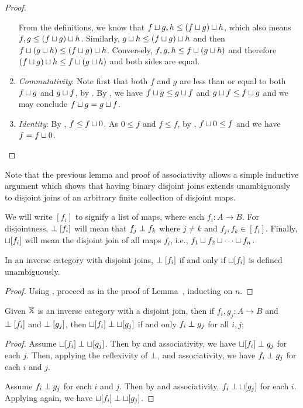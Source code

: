 \begin{proof}
\begin{enumerate}[{(}i{)}]
      From the definitions, we know that $f\sqcup g, h \le (f\sqcup g)\sqcup h$, which also means
      $f, g \le (f\sqcup g)\sqcup h$. Similarly, $g\sqcup h \le (f\sqcup g)\sqcup h $ and then $f
      \sqcup (g\sqcup h)\le (f\sqcup g)\sqcup h$. Conversely, $f,g,h \le f \sqcup (g\sqcup h)$ and
      therefore $(f\sqcup g)\sqcup h \le f \sqcup (g\sqcup h)$ and both sides are equal.
    \item \emph{Commutativity}: Note first that both $f$ and $g$ are less than or equal to both
      $f\sqcup g$ and $g \sqcup f$, by . By , we have $f \sqcup g \le
      g\sqcup f$ and $g\sqcup f \le f \sqcup g$ and we may conclude $f \sqcup g = g \sqcup f$.
    \item \emph{Identity}: By , $f \le f \sqcup 0$. As $0 \le f$ and $f \le f$, by
      , $f \sqcup 0 \le f$ and we have $f = f \sqcup 0$.
  \end{enumerate}
\end{proof}

Note that the previous lemma and proof of associativity allows a simple inductive argument which
shows that having binary disjoint joins extends unambiguously to disjoint joins of an arbitrary
finite collection of disjoint maps.

We will write $[f_i]$ to signify a list of maps, where each $f_i: A \to B$. For disjointness,
$\perp [f_i]$ will mean that $f_j \perp f_k$ where $j\ne k$ and $f_j, f_k \in [f_i]$. Finally,
$\sqcup [f_i]$ will mean the disjoint join of all maps $f_i$, i.e.,
$f_1 \sqcup f_2 \sqcup \cdots \sqcup f_n$.

\begin{lemma}\label{lem:arbitrary_disjoint_joins}
  In an inverse category with disjoint joins, $\perp [f_i]$ if and only if
  $\sqcup [f_i]$ is defined unambiguously.
\end{lemma}
\begin{proof}
  Using , proceed as in the proof of
  Lemma~,
  inducting on $n$.
\end{proof}


\begin{lemma}\label{lem:disjoint_joins_only_when_all_disjoint}
  Given $\mathbb{X}$ is an inverse category with a disjoint join, then if $f_i, g_j : A \to B$ and $\perp
  [f_i]$ and $\perp [g_j]$, then $\sqcup [f_i] \perp \sqcup [g_j]$ if and only $f_i \perp
  g_j$ for all $i,j$;
\end{lemma}
\begin{proof}
  Assume $\sqcup [f_i] \perp \sqcup [g_j]$. Then by  and associativity, we have
  $\sqcup [f_i] \perp g_j$ for each $j$. Then, applying the reflexivity of $\perp$,
   and associativity, we have $f_i \perp g_j$ for each $i$ and $j$.

  Assume $f_i \perp g_j$ for each $i$ and $j$. Then by  and associativity, $f_i
  \perp \sqcup [g_j]$ for each $i$. Applying  again, we have $\sqcup [f_i] \perp
  \sqcup [g_j]$.
\end{proof}

